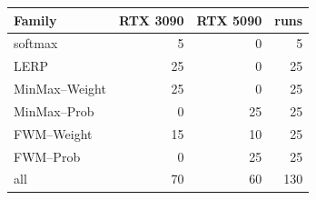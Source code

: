 \begin{tabular}{lrrr}
\toprule
Family & RTX 3090 & RTX 5090 & runs \\
\midrule
softmax & 5 & 0 & 5 \\
LERP & 25 & 0 & 25 \\
MinMax--Weight & 25 & 0 & 25 \\
MinMax--Prob & 0 & 25 & 25 \\
FWM--Weight & 15 & 10 & 25 \\
FWM--Prob & 0 & 25 & 25 \\
\midrule all & 70 & 60 & 130 \\
\bottomrule
\end{tabular}
